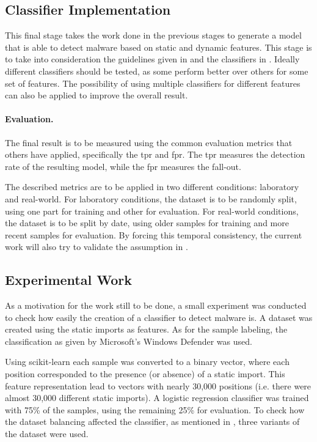 \documentclass{llncs}
\begin{document}
\subsection{Classifier Implementation}\label{subsec:class_implementation}

This final stage takes the work done in the previous stages to generate a model that is able to detect malware based on static and dynamic features. This stage is to take into consideration the guidelines given in \cite{rossow:practices,shabtai:survey} and the classifiers in \cite{miller:rev_int,nissim:al_pdf,rieck:dynamic,schultz:data_mining}. Ideally different classifiers should be tested, as some perform better over others for some set of features. The possibility of using multiple classifiers for different features can also be applied to improve the overall result.

\paragraph{Evaluation.} The final result is to be measured using the common evaluation metrics that others\cite{miller:rev_int,nissim:al_pdf,schultz:data_mining} have applied, specifically the \gls{tpr} and \gls{fpr}. The \gls{tpr} measures the detection rate of the resulting model, while the \gls{fpr} measures the fall-out.

The described metrics are to be applied in two different conditions: laboratory and real-world. For laboratory conditions, the dataset is to be randomly split, using one part for training and other for evaluation. For real-world conditions, the dataset is to be split by date, using older samples for training and more recent samples for evaluation. By forcing this temporal consistency, the current work will also try to validate the assumption in \cite{miller:rev_int}.

\subsection{Experimental Work}\label{subsec:exp_work}

As a motivation for the work still to be done, a small experiment was conducted to check how easily the creation of a classifier to detect malware is. A dataset was created using the static imports as features. As for the sample labeling, the classification as given by Microsoft's Windows Defender was used.

Using scikit-learn\cite{tool:sklearn} each sample was converted to a binary vector, where each position corresponded to the presence (or absence) of a static import. This feature representation lead to vectors with nearly 30,000 positions (i.e. there were almost 30,000 different static imports). A logistic regression classifier was trained with 75\% of the samples, using the remaining 25\% for evaluation. To check how the dataset balancing affected the classifier, as mentioned in \cite{rossow:practices}, three variants of the dataset were used.
\end{document}
